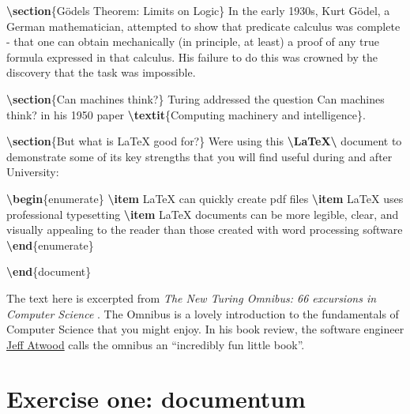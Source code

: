 \documentclass[
]{book}
\newenvironment{Shaded}{\begin{snugshade}}{\end{snugshade}}
\newcommand{\ExtensionTok}[1]{#1}
\newcommand{\FunctionTok}[1]{\textcolor[rgb]{0.13,0.29,0.53}{\textbf{#1}}}
\newcommand{\KeywordTok}[1]{\textcolor[rgb]{0.13,0.29,0.53}{\textbf{#1}}}
\newcommand{\NormalTok}[1]{#1}
\begin{document}
\begin{Shaded}
\begin{Highlighting}[]
\KeywordTok{\textbackslash{}section}\NormalTok{\{Gödel\textquotesingle{}s Theorem: Limits on Logic\}}
\NormalTok{In the early 1930\textquotesingle{}s, Kurt Gödel, a German mathematician, attempted to show that predicate calculus was complete {-} that one can obtain mechanically  (in principle, at least) a proof of any true formula expressed in that calculus. His failure to do this was crowned by the discovery that the task was impossible.}

\KeywordTok{\textbackslash{}section}\NormalTok{\{Can machines think?\}}
\NormalTok{Turing addressed the question \textasciigrave{}\textasciigrave{}Can machines think?\textquotesingle{}\textquotesingle{} in his 1950 paper }\FunctionTok{\textbackslash{}textit}\NormalTok{\{Computing machinery and intelligence\}.}

\KeywordTok{\textbackslash{}section}\NormalTok{\{But what is LaTeX good for?\}}
\NormalTok{We\textquotesingle{}re using this }\FunctionTok{\textbackslash{}LaTeX\textbackslash{} }\NormalTok{document to demonstrate some of its key strengths that you will find useful during and after University:}

\KeywordTok{\textbackslash{}begin}\NormalTok{\{}\ExtensionTok{enumerate}\NormalTok{\}}
\FunctionTok{\textbackslash{}item}\NormalTok{ LaTeX can quickly create pdf files}
\FunctionTok{\textbackslash{}item}\NormalTok{ LaTeX uses professional typesetting}
\FunctionTok{\textbackslash{}item}\NormalTok{ LaTeX documents can be more legible, clear, and visually appealing to the reader than those created with word processing software}
\KeywordTok{\textbackslash{}end}\NormalTok{\{}\ExtensionTok{enumerate}\NormalTok{\}}

\KeywordTok{\textbackslash{}end}\NormalTok{\{}\ExtensionTok{document}\NormalTok{\}}
\end{Highlighting}
\end{Shaded}

The text here is excerpted from \emph{The New Turing Omnibus: 66 excursions in Computer Science} \citep{turingomnibus}. The Omnibus is a lovely introduction to the fundamentals of Computer Science that you might enjoy. In his book review, the software engineer \href{https://en.wikipedia.org/wiki/Jeff_Atwood}{Jeff Atwood} calls the omnibus an ``incredibly fun little book''. \citep{codinghorror}

\section{Exercise one: documentum}\label{ex1}
\end{document}

